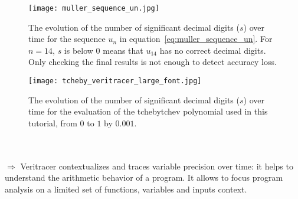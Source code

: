  \begin{figure}[h!]
  \centering\texttt{[image: muller\_sequence\_un.jpg]}
  \caption{The evolution of the number of significant decimal digits ($s$) over time
     for the sequence $u_n$ in equation~\ref{eq:muller_sequence_un}.
    For $n=14$, $s$ is below 0 means that $u_{14}$ has no correct decimal digits.
     Only checking the final results is not enough to detect accuracy loss.
  }

 \label{fig:muller_sequence_un}
 \end{figure}
%
%
\begin{figure}[h!]
  \centering\texttt{[image: tcheby\_veritracer\_large\_font.jpg]}
 \caption{The evolution of the number of significant decimal digits ($s$) over time
     for the evaluation of the tchebytchev polynomial used in this tutorial, from $0$ to $1$ by $0.001$.
  }
 \label{fig:veritcheby}
 \end{figure}
%
%
 ~\\~\\$\Rightarrow$ Veritracer contextualizes and traces variable precision over time: it helps to understand the arithmetic behavior of a program. It allows to focus program analysis on a limited set of functions, variables and inputs context.
%

